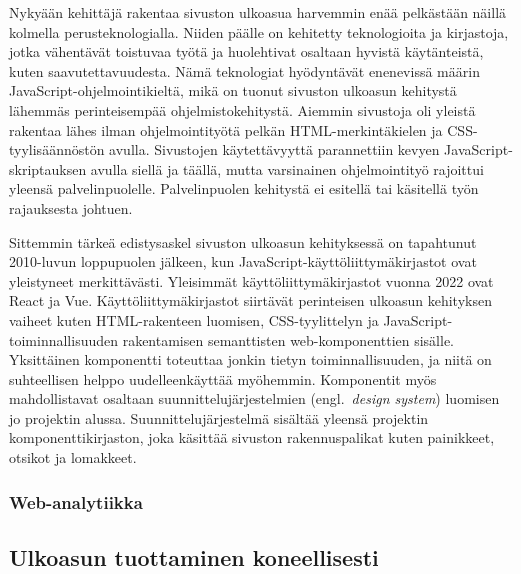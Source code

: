 \documentclass[finnish, 12pt, a4paper, elec, utf8, a-1b, online]{aaltothesis}
\begin{document}
Nykyään kehittäjä rakentaa sivuston ulkoasua harvemmin enää pelkästään näillä
kolmella perusteknologialla. Niiden päälle on kehitetty teknologioita ja
kirjastoja, jotka vähentävät toistuvaa työtä ja huolehtivat osaltaan hyvistä
käytänteistä, kuten saavutettavuudesta. Nämä teknologiat hyödyntävät enenevissä
määrin JavaScript-ohjelmointikieltä, mikä on tuonut sivuston ulkoasun kehitystä
lähemmäs perinteisempää ohjelmistokehitystä. Aiemmin sivustoja oli yleistä
rakentaa lähes ilman ohjelmointityötä pelkän HTML-merkintäkielen ja
CSS-tyylisäännöstön avulla. Sivustojen käytettävyyttä parannettiin kevyen
JavaScript-skriptauksen avulla siellä ja täällä, mutta varsinainen
ohjelmointityö rajoittui yleensä palvelinpuolelle. Palvelinpuolen kehitystä ei
esitellä tai käsitellä työn rajauksesta johtuen.

Sittemmin tärkeä edistysaskel sivuston ulkoasun kehityksessä on tapahtunut
2010-luvun loppupuolen jälkeen, kun JavaScript-käyttöliittymäkirjastot ovat
yleistyneet merkittävästi. Yleisimmät käyttöliittymäkirjastot vuonna 2022 ovat
React ja Vue. Käyttöliittymäkirjastot siirtävät perinteisen ulkoasun kehityksen
vaiheet kuten HTML-rakenteen luomisen, CSS-tyylittelyn ja
JavaScript-toiminnallisuuden rakentamisen semanttisten web-komponenttien
sisälle. Yksittäinen komponentti toteuttaa jonkin tietyn toiminnallisuuden, ja
niitä on suhteellisen helppo uudelleenkäyttää myöhemmin. Komponentit myös
mahdollistavat osaltaan suunnittelujärjestelmien (engl.~\textit{design system})
luomisen jo projektin alussa. Suunnittelujärjestelmä sisältää yleensä projektin
komponenttikirjaston, joka käsittää sivuston rakennuspalikat kuten painikkeet,
otsikot ja lomakkeet.


\subsubsection{Web-analytiikka}

\subsection{Ulkoasun tuottaminen koneellisesti}

\end{document}
